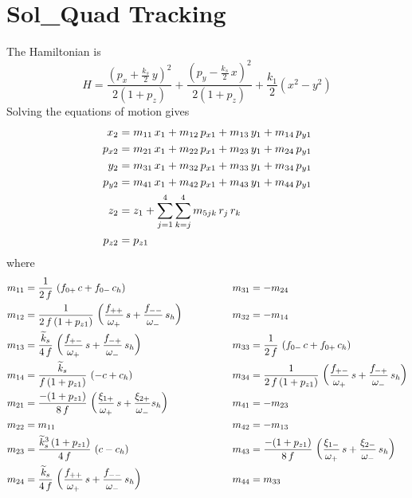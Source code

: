 \section{Sol\_Quad Tracking}
\label{s:sol.quad.std}

The Hamiltonian is
\begin{equation}
  H = \frac{(p_x + \frac{k_s }{2}\, y)^2}{2 (1 + p_z)} + 
  \frac{(p_y - \frac{k_s}{2} \, x)^2}{2 (1 + p_z)} + \frac{k_1}{2} (x^2 - y^2)
\end{equation}
Solving the equations of motion gives
\begin{align}
  x_2    &= m_{11} \, x_1 + m_{12} \, p_{x1} + m_{13} \, y_1 + m_{14} \, p_{y1} \nonumber \\
  p_{x2} &= m_{21} \, x_1 + m_{22} \, p_{x1} + m_{23} \, y_1 + m_{24} \, p_{y1} \nonumber \\
  y_2    &= m_{31} \, x_1 + m_{32} \, p_{x1} + m_{33} \, y_1 + m_{34} \, p_{y1} \nonumber \\
  p_{y2} &= m_{41} \, x_1 + m_{42} \, p_{x1} + m_{43} \, y_1 + m_{44} \, p_{y1} \\
  z_2    &= z_1 + \sum_{j = 1}^4 \sum_{k = j}^4 m_{5jk} \, r_j \, r_k  \nonumber \\
  p_{z2} &= p_{z1} \nonumber
\end{align}
where
\begin{alignat}{2}
  m_{11} &= \frac{1}{2 \, f} \, \left( f_{0+} \, c + f_{0-} \, c_h \right) & \qquad \qquad
  m_{31} &= -m_{24} \nonumber \\
  m_{12} &= \frac{1}{2 \, f \, (1 + p_{z1})} \, 
            \left( \frac{f_{++}}{\omega_+} \,  s + \frac{f_{--}}{\omega_-} \, s_h \right) & \qquad \qquad
  m_{32} &= -m_{14} \nonumber \\
  m_{13} &= \frac{\widetilde k_s}{4 \, f} \, 
            \left( \frac{f_{+-}}{\omega_+} \, s +\frac{f_{-+}}{\omega_-} \, s_h \right) & \qquad \qquad
  m_{33} &= \frac{1}{2 \, f} \, \left( f_{0-} \, c + f_{0+} \, c_h \right) \nonumber \\
  m_{14} &= \frac{\widetilde k_s}{f \, (1 + p_{z1})} \, \left( -c + c_h \right) & \qquad \qquad
  m_{34} &= \frac{1}{2 \, f \, (1 + p_{z1})} \, 
            \left( \frac{f_{+-}}{\omega_+} \, s + \frac{f_{-+}}{\omega_-} \, s_h \right) \nonumber \\
  m_{21} &= \frac{-(1 + p_{z1})}{8 \, f} \, 
            \left( \frac{\xi_{1+}}{\omega_+} \, s + \frac{\xi_{2+}}{\omega_-} s_h \right) & \qquad \qquad
  m_{41} &= -m_{23} \\
  m_{22} &= m_{11} & \qquad \qquad
  m_{42} &= -m_{13} \nonumber \\
  m_{23} &= \frac{\widetilde k_s^3 \, (1 + p_{z1})}{4 \, f} \, \left( c - c_h \right) & \qquad \qquad
  m_{43} &= \frac{-(1 + p_{z1})}{8 \, f} \, 
            \left( \frac{\xi_{1-}}{\omega_+} \, s + \frac{\xi_{2-}}{\omega_-} \, s_h \right) \nonumber \\
  m_{24} &= \frac{\widetilde k_s}{4 \, f} \, 
            \left( \frac{f_{++}}{\omega_+} \, s + \frac{f_{--}}{\omega_-} \, s_h \right) & \qquad \qquad
  m_{44} &= m_{33} \nonumber
\end{alignat}
